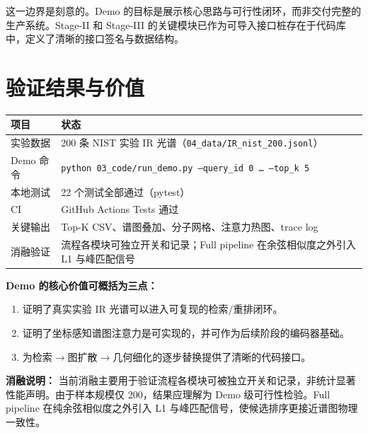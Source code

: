 \documentclass[11pt,a4paper]{ctexart}
\begin{document}
{\small\color{greytext} 这一边界是刻意的。Demo 的目标是展示核心思路与可行性闭环，而非交付完整的生产系统。Stage-II 和 Stage-III 的关键模块已作为可导入接口桩存在于代码库中，定义了清晰的接口签名与数据结构。}

\section{验证结果与价值}

\begin{table}[ht]
\small
\begin{tabular}{@{}p{} p{}@{}}
\toprule
\bfseries 项目 & \bfseries 状态 \\
\midrule
实验数据 &
  200 条 NIST 实验 IR 光谱（\texttt{04\_data/IR\_nist\_200.jsonl}）\\
Demo 命令 &
  \texttt{python 03\_code/run\_demo.py --query\_id 0 \dots\ --top\_k 5} \\
本地测试 &
  22 个测试全部通过（pytest）\\
CI &
  GitHub Actions Tests 通过 \\
关键输出 &
  Top-K CSV、谱图叠加、分子网格、注意力热图、trace log \\
消融验证 &
  流程各模块可独立开关和记录；Full pipeline 在余弦相似度之外引入 L1 与峰匹配信号 \\
\bottomrule
\end{tabular}
\end{table}

\vspace{-4pt}
\textbf{Demo 的核心价值可概括为三点：}
\begin{enumerate}[nosep]
  \item 证明了真实实验 IR 光谱可以进入可复现的检索/重排闭环。
  \item 证明了坐标感知谱图注意力是可实现的，并可作为后续阶段的编码器基础。
  \item 为检索$\rightarrow$图扩散$\rightarrow$几何细化的逐步替换提供了清晰的代码接口。
\end{enumerate}

{\small\color{greytext}\textbf{消融说明：} 当前消融主要用于验证流程各模块可被独立开关和记录，非统计显著性能声明。由于样本规模仅 200，结果应理解为 Demo 级可行性检验。Full pipeline 在纯余弦相似度之外引入 L1 与峰匹配信号，使候选排序更接近谱图物理一致性。}
\end{document}
